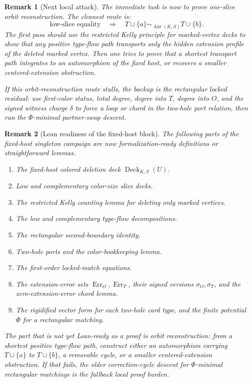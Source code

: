 \documentclass[11pt]{article}
\newtheorem{remark}{Remark}
\newcommand{\Deck}{\operatorname{Deck}}
\newcommand{\Err}{\operatorname{Err}}
\begin{document}
\begin{remark}[Next local attack]
The immediate task is now to prove one-slice orbit reconstruction.  The cleanest
route is:
\[
  \text{low-slice equality}
  \quad\Longrightarrow\quad
  T\cup\{a\}\sim_{\operatorname{Aut}(K,S)}T\cup\{b\}.
\]
The first pass should use the restricted Kelly principle for marked-vertex
decks to show that any positive type-flow path transports only the hidden
extension profile of the deleted marked vertex.  Then one tries to prove that a
shortest transport path integrates to an automorphism of the fixed host, or
recovers a smaller centered-extension obstruction.

If this orbit-reconstruction route stalls, the backup is the rectangular locked
residual: use first-color status, total degree, degree into \(T\), degree into
\(O\), and the signed witness charge \(\delta\) to force a loop or chord in the
two-hole port relation, then run the \(\Phi\)-minimal partner-swap descent.
\end{remark}

\begin{remark}[Lean readiness of the fixed-host block]
The following parts of the fixed-host singleton campaign are now
formalization-ready definitions or straightforward lemmas.

\begin{enumerate}[leftmargin=2em]
  \item The fixed-host colored deletion deck \(\Deck_{K,S}(U)\).
  \item Low and complementary color-size slice decks.
  \item The restricted Kelly counting lemma for deleting only marked vertices.
  \item The low and complementary type-flow decompositions.
  \item The rectangular second-boundary identity.
  \item Two-hole ports and the color-bookkeeping lemma.
  \item The first-order locked-match equations.
  \item The extension-error sets \(\Err_O,\Err_T\), their signed versions
  \(\sigma_O,\sigma_T\), and the zero-extension-error chord lemma.
  \item The rigidified vector form for each two-hole card type, and the
  finite potential \(\Phi\) for a rectangular matching.
\end{enumerate}

The part that is not yet Lean-ready as a proof is orbit reconstruction: from a
shortest positive type-flow path, construct either an automorphism carrying
\(T\cup\{a\}\) to \(T\cup\{b\}\), a removable cycle, or a smaller
centered-extension obstruction.  If that fails, the older correction-cycle
descent for \(\Phi\)-minimal rectangular matchings is the fallback local proof
burden.
\end{remark}
\end{document}
